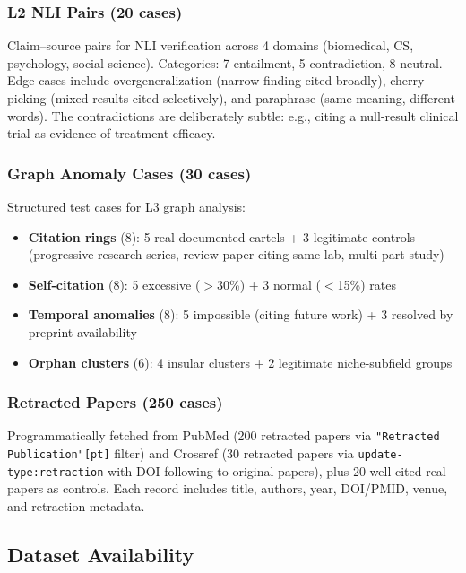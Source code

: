 \documentclass[sigconf,nonacm]{acmart}
\begin{document}
\subsubsection{L2 NLI Pairs (20 cases)}

Claim--source pairs for NLI verification across 4 domains (biomedical, CS, psychology, social science).
Categories: 7 entailment, 5 contradiction, 8 neutral.
Edge cases include overgeneralization (narrow finding cited broadly), cherry-picking (mixed results cited selectively), and paraphrase (same meaning, different words).
The contradictions are deliberately subtle: e.g., citing a null-result clinical trial as evidence of treatment efficacy.

\subsubsection{Graph Anomaly Cases (30 cases)}

Structured test cases for L3 graph analysis:
\begin{itemize}[leftmargin=*]
    \item \textbf{Citation rings} (8): 5 real documented cartels + 3 legitimate controls (progressive research series, review paper citing same lab, multi-part study)
    \item \textbf{Self-citation} (8): 5 excessive ($>$30\%) + 3 normal ($<$15\%) rates
    \item \textbf{Temporal anomalies} (8): 5 impossible (citing future work) + 3 resolved by preprint availability
    \item \textbf{Orphan clusters} (6): 4 insular clusters + 2 legitimate niche-subfield groups
\end{itemize}

\subsubsection{Retracted Papers (250 cases)}

Programmatically fetched from PubMed (200 retracted papers via \texttt{"Retracted Publication"[pt]} filter) and Crossref (30 retracted papers via \texttt{update-type:retraction} with DOI following to original papers), plus 20 well-cited real papers as controls.
Each record includes title, authors, year, DOI/PMID, venue, and retraction metadata.

\subsection{Dataset Availability}
\end{document}
